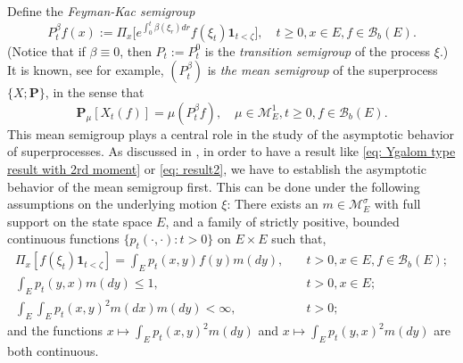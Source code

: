\documentclass[12pt, a4paper]{amsart}
\theoremstyle{definition}
\newenvironment{asp}[1]{\renewcommand\theinnerasp{#1}\innerasp}{\endinnerasp}
\numberwithin{equation}{section}
\begin{document}
	Define the \emph{Feyman-Kac semigroup}
\[
	P^\beta_tf(x)
		:=
	\Pi_x \big[e^{\int_0^{t} \beta(\xi_r)dr} f(\xi_t)\mathbf 1_{t<\zeta}\big],
	\quad t\geq 0, x\in E, f\in \mathscr B_b(E).
\]
	(Notice that if $\beta \equiv 0$,
then $P_t:= P^0_t$ is the \emph{transition semigroup} of the process $\xi$.)
	It is known, see \cite[Proposition 2.27]{Li2011Measure-valued} for example, $(P^\beta_t)$ is \emph{the mean semigroup} of the superprocess $\{X; \mathbf P\}$, in the sense that
	\[ \label{eq: Ygalom type result without 2rd moment}
	\mathbf P_\mu [X_t(f)]
	= \mu(P^\beta_t f),
	\quad \mu \in \mathcal M^1_E,
	t \geq 0,f \in \mathscr B_b(E).
	\]
	This mean semigroup plays a central role in the study of the asymptotic behavior of superprocesses.
	As discussed in \cite{EvansPerkins1990Measure-valued}, in order to have a result like \eqref{eq: Ygalom type result with 2rd moment}
		or \eqref{eq: result2},
	we have to establish the asymptotic behavior of the mean semigroup first.
	This can be done under the following assumptions on the underlying motion
    $\xi$:
\begin{asp}{1}
\label{asp: 1}
	There exists an $m \in \mathcal M_E^\sigma$ with full support on the state space $E$, and a family of strictly positive, bounded continuous functions $\{ p_t(\cdot,\cdot): t > 0 \}$ on $E \times E$ such that,
\[\begin{split}
	\Pi_x[ f(\xi_t)\mathbf 1_{t < \zeta} ]
	= \int_E p_t(x,y) f(y) m(dy),
	&\quad t>0, x \in E,f \in \mathscr B_b(E);
	\\\int_E p_t(y,x)m(dy)
	\leq 1,	
	&\quad t>0,x\in E;
	\\\int_E \int_E p_t(x,y)^2 m(dx) m(dy)
	<\infty,
	&\quad t> 0;
\end{split}\]
	and the functions $x \mapsto \int_E p_t(x,y)^2 m(dy)$
and
	$x \mapsto \int_E p_t(y,x)^2 m(dy)$ are both continuous.
\end{asp}
\end{document}

